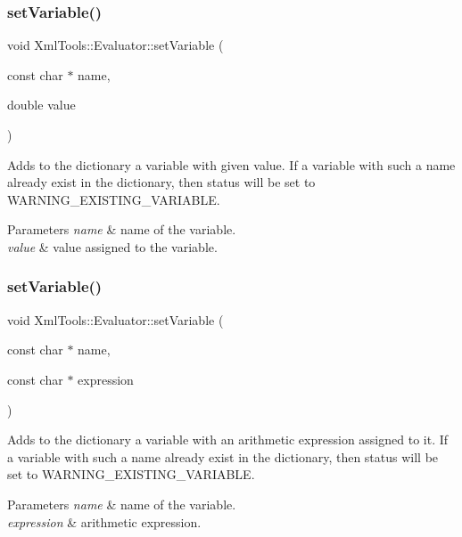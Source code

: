 \subsubsection{\texorpdfstring{set\+Variable()}{setVariable()}\hspace{0.1cm}{\footnotesize\ttfamily [1/2]}}
{\footnotesize\ttfamily void Xml\+Tools\+::\+Evaluator\+::set\+Variable (\begin{DoxyParamCaption}\item[{const char $\ast$}]{name,  }\item[{double}]{value }\end{DoxyParamCaption})}

Adds to the dictionary a variable with given value. If a variable with such a name already exist in the dictionary, then status will be set to W\+A\+R\+N\+I\+N\+G\+\_\+\+E\+X\+I\+S\+T\+I\+N\+G\+\_\+\+V\+A\+R\+I\+A\+B\+LE.


\begin{DoxyParams}{Parameters}
{\em name} & name of the variable. \\
\hline
{\em value} & value assigned to the variable. \\
\hline
\end{DoxyParams}
\hypertarget{class_xml_tools_1_1_evaluator_aa585fa26afb0fbf64b60f9758a7de5f0}{}\label{class_xml_tools_1_1_evaluator_aa585fa26afb0fbf64b60f9758a7de5f0} 
\subsubsection{\texorpdfstring{set\+Variable()}{setVariable()}\hspace{0.1cm}{\footnotesize\ttfamily [2/2]}}
{\footnotesize\ttfamily void Xml\+Tools\+::\+Evaluator\+::set\+Variable (\begin{DoxyParamCaption}\item[{const char $\ast$}]{name,  }\item[{const char $\ast$}]{expression }\end{DoxyParamCaption})}

Adds to the dictionary a variable with an arithmetic expression assigned to it. If a variable with such a name already exist in the dictionary, then status will be set to W\+A\+R\+N\+I\+N\+G\+\_\+\+E\+X\+I\+S\+T\+I\+N\+G\+\_\+\+V\+A\+R\+I\+A\+B\+LE.


\begin{DoxyParams}{Parameters}
{\em name} & name of the variable. \\
\hline
{\em expression} & arithmetic expression. \\
\hline
\end{DoxyParams}
\hypertarget{class_xml_tools_1_1_evaluator_af9265974643b0e1b1411ef5cea2b8580}{}\label{class_xml_tools_1_1_evaluator_af9265974643b0e1b1411ef5cea2b8580} 
